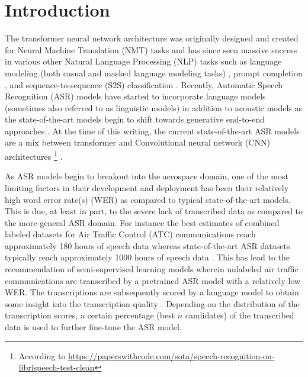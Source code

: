 \documentclass[10pt]{article}
\begin{document}
    \section{Introduction}
        The transformer neural network architecture was originally designed and created for Neural Machine
        Translation (NMT) tasks \cite{vaswani_attention_2017} and has since seen massive success in various
        other Natural Language Processing (NLP) tasks such as language modeling (both casual and masked language
        modeling tasks) \cite{devlin_bert_2019}, prompt completion \cite{radford_improving_2018}, and
        sequence-to-sequence (S2S) classification \cite{lewis_bart_2019}.
        Recently, Automatic Speech Recognition (ASR) models have started to incorporate language models
        \cite{badrinath_automatic_2022} (sometimes also referred to as linguistic models) in addition to
        acoustic models \cite{li_jasper_2019} as the state-of-the-art models begin to shift towards generative
        end-to-end approaches \cite{hannun_deep_2014}.
        At the time of this writing, the current state-of-the-art ASR models are a mix between transformer
        and Convolutional neural network (CNN) architectures
        \footnote{According to \url{https://paperswithcode.com/sota/speech-recognition-on-librispeech-test-clean}}
        \cite{baevski_wav2vec_2020}.


        As ASR models begin to breakout into the aerospace domain, one of the most limiting factors in their
        development and deployment has been their relatively high word error rate(s) (WER)
        \cite{smidl_air_2019,zuluaga-gomez_automatic_2020,badrinath_automatic_2022} as compared to typical state-of-the-art models.
        This is due, at least in part, to the severe lack of transcribed data as compared to the more general ASR domain.
        For instance the best estimates of combined labeled datasets for Air Traffic Control (ATC)
        communications reach approximately 180 hours of speech data \cite{zuluaga-gomez_automatic_2020} whereas
        state-of-the-art ASR datasets typically reach approximately 1000 hours of speech data \cite{panayotov_librispeech_2015}.
        This has lead to the recommendation of semi-supervised learning models wherein unlabeled air
        traffic communications are transcribed by a pretrained ASR model with a relatively low WER.
        The transcriptions are subsequently scored by a language model to obtain some insight into the
        transcription quality \cite{badrinath_automatic_2022,zuluaga-gomez_contextual_2021}.
        Depending on the distribution of the transcription scores, a certain percentage (best $n$ candidates)
        of the transcribed data is used to further fine-tune the ASR model.
\end{document}
